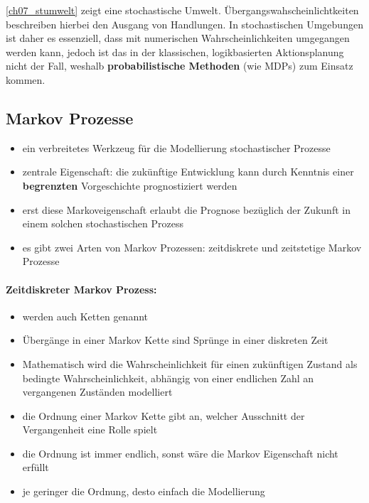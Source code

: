 \autoref{ch07_stumwelt} zeigt eine stochastische Umwelt.
\"Ubergangswahscheinlichtkeiten beschreiben hierbei den Ausgang von Handlungen.
In stochastischen Umgebungen ist daher es essenziell, dass mit numerischen Wahrscheinlichkeiten umgegangen werden kann, jedoch ist das in der klassischen, logikbasierten Aktionsplanung nicht der Fall, weshalb \textbf{probabilistische Methoden} (wie MDPs) zum Einsatz kommen.
\subsection{Markov Prozesse}
\begin{itemize}
\item ein verbreitetes Werkzeug f\"ur die Modellierung stochastischer Prozesse
\item zentrale Eigenschaft: die zuk\"unftige Entwicklung kann durch Kenntnis einer \textbf{begrenzten} Vorgeschichte prognostiziert werden
\item erst diese Markoveigenschaft erlaubt die Prognose bez\"uglich der Zukunft in einem solchen stochastischen Prozess
\item es gibt zwei Arten von Markov Prozessen: zeitdiskrete und zeitstetige Markov Prozesse
\end{itemize}

\paragraph{Zeitdiskreter Markov Prozess:}
\begin{itemize}
\item werden auch Ketten genannt
\item \"Uberg\"ange in einer Markov Kette sind Spr\"unge in einer diskreten Zeit
\item Mathematisch wird die Wahrscheinlichkeit f\"ur einen zuk\"unftigen Zustand als bedingte Wahrscheinlichkeit, abh\"angig von einer endlichen Zahl an vergangenen Zust\"anden modelliert
\item die Ordnung einer Markov Kette gibt an, welcher Ausschnitt der Vergangenheit eine Rolle spielt
\item die Ordnung ist immer endlich, sonst w\"are die Markov Eigenschaft nicht erf\"ullt
\item je geringer die Ordnung, desto einfach die Modellierung
\end{itemize}

